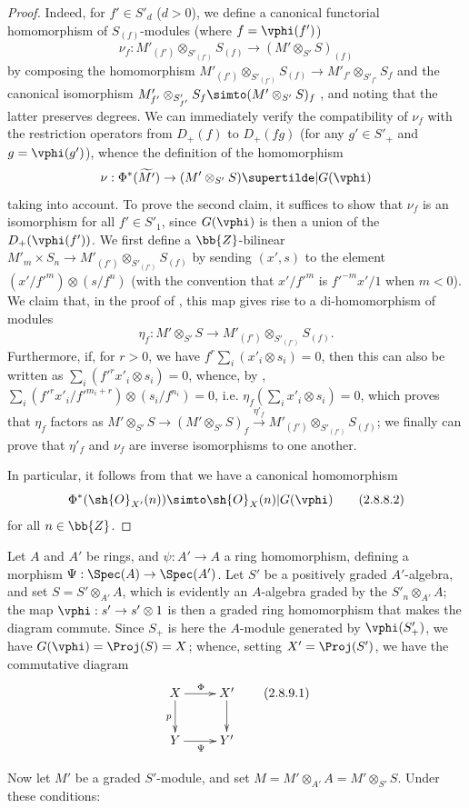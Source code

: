 \begin{proof}
Indeed, for $f'\in S'_d$ ($d>0$), we define a canonical functorial homomorphism of $S_{(f)}$-modules (where $f=\vphi(f')$)
\[
\label{II.2.8.8.1}
  \nu_f: M'_{(f')}\otimes_{S'_{(f')}}S_{(f)} \to (M'\otimes_{S'}S)_{(f)}
\tag{2.8.8.1}
\]
by composing the homomorphism $M'_{(f')}\otimes_{S'_{(f')}}S_{(f)}\to M'_{f'}\otimes_{S'_{f'}}S_f$ and the canonical isomorphism $M'_{f'}\otimes_{S'_{f'}}S_f\simto(M'\otimes_{S'}S)_f$ , and noting that the latter preserves degrees.
We can immediately verify the compatibility of $\nu_f$ with the restriction operators from $D_+(f)$ to $D_+(fg)$ (for any $g'\in S'_+$ and $g=\vphi(g')$), whence the definition of the homomorphism
\[
  \nu: \Phi^*(\widetilde{M'}) \to (M'\otimes_{S'}S)\supertilde|G(\vphi)
\]
taking  into account.
To prove the second claim, it suffices to show that $\nu_f$ is an isomorphism for all $f'\in S'_1$, since $G(\vphi)$ is then a union of the $D_+(\vphi(f'))$.
We first define a $\bb{Z}$-bilinear $M'_m\times S_n\to M'_{(f')}\otimes_{S'_{(f')}}S_{(f)}$ by sending $(x',s)$ to the element $(x'/{f'}^m)\otimes(s/f^n)$ (with the convention that $x'/{f'}^m$ is ${f'}^{-m}x'/1$ when $m<0$).
We claim that, in the proof of , this map gives rise to a di-homomorphism of modules
\[
  \eta_f: M'\otimes_{S'}S \to M'_{(f')}\otimes_{S'_{(f')}}S_{(f)}.
\]
Furthermore, if, for $r>0$, we have $f^r\sum_i(x'_i\otimes s_i)=0$, then this can also be written as $\sum_i({f'}^rx'_i\otimes s_i)=0$, whence, by , $\sum_i({f'}^rx'_i/{f'}^{m_i+r})\otimes(s_i/f^{n_i})=0$, i.e. $\eta_f(\sum_i x'_i\otimes s_i)=0$, which proves that $\eta_f$ factors as $M'\otimes_{S'}S\to(M'\otimes_{S'}S)_f\xrightarrow{\eta'_f}M'_{(f')}\otimes_{S'_{(f')}}S_{(f)}$;
we finally can prove that $\eta'_f$ and $\nu_f$ are inverse isomorphisms to one another.

In particular, it follows from  that we have a canonical homomorphism
\[
\label{II.2.8.8.2}
  \Phi^*(\sh{O}_{X'}(n)) \simto \sh{O}_X(n)|G(\vphi)
\tag{2.8.8.2}
\]
for all $n\in\bb{Z}$.
\end{proof}

\begin{env}[2.8.9]
\label{II.2.8.9}
Let $A$ and $A'$ be rings, and $\psi:A'\to A$ a ring homomorphism, defining a morphism $\Psi:\Spec(A)\to\Spec(A')$.
Let $S'$ be a positively graded $A'$-algebra, and set $S=S'\otimes_{A'}A$, which is evidently an $A$-algebra graded by the $S'_n\otimes_{A'}A$;
the map $\vphi:s'\to s'\otimes1$ is then a graded ring homomorphism that makes the diagram  commute.
Since $S_+$ is here the $A$-module generated by $\vphi(S'_+)$, we have $G(\vphi)=\Proj(S)=X$;
whence, setting $X'=\Proj(S')$, we have the commutative diagram
\[
\label{II.2.8.9.1}
  \xymatrix{
    X \ar[r]^{\Phi} \ar[d]_p
    & X' \ar[d]
  \\Y \ar[r]_{\Psi}
    & Y'
  }
\tag{2.8.9.1}
\]

Now let $M'$ be a graded $S'$-module, and set $M=M'\otimes_{A'}A=M'\otimes_{S'}S$.
Under these conditions:
\end{env}

